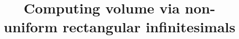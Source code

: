 \documentclass{article}
\theoremstyle{theorem}
\theoremstyle{definition}
\begin{document}
\title{Computing volume via non-uniform rectangular infinitesimals}

\maketitle


\end{document}
